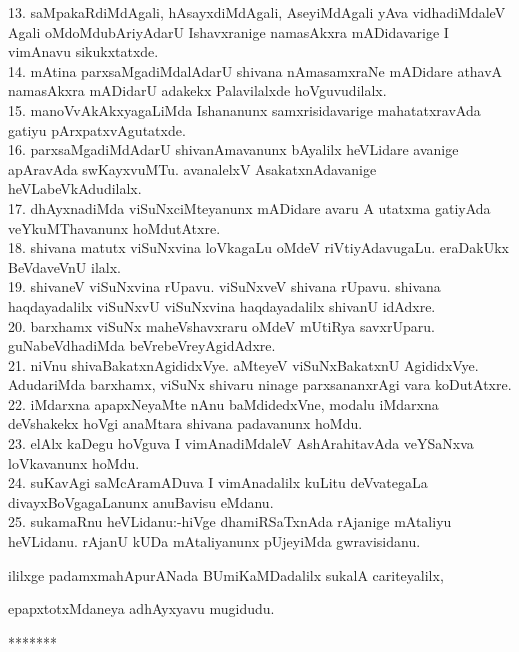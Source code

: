\documentclass{article}
\begin{document}
13. saMpakaRdiMdAgali, hAsayxdiMdAgali, AseyiMdAgali yAva vidhadiMdaleV Agali oMdoMdubAriyAdarU Ishavxranige namasAkxra mADidavarige I vimAnavu sikukxtatxde.\\
14. mAtina parxsaMgadiMdalAdarU shivana nAmasamxraNe mADidare athavA namasAkxra mADidarU adakekx Palavilalxde hoVguvudilalx.\\
15. manoVvAkAkxyagaLiMda Ishananunx samxrisidavarige mahatatxravAda gatiyu pArxpatxvAgutatxde.\\
16. parxsaMgadiMdAdarU shivanAmavanunx bAyalilx heVLidare avanige apAravAda swKayxvuMTu. avanalelxV AsakatxnAdavanige heVLabeVkAdudilalx.\\
17. dhAyxnadiMda viSuNxciMteyanunx mADidare avaru A utatxma gatiyAda veYkuMThavanunx hoMdutAtxre.\\
18. shivana matutx viSuNxvina loVkagaLu oMdeV riVtiyAdavugaLu. eraDakUkx BeVdaveVnU ilalx.\\
19. shivaneV viSuNxvina rUpavu. viSuNxveV shivana rUpavu. shivana haqdayadalilx viSuNxvU viSuNxvina haqdayadalilx shivanU idAdxre.\\
20. barxhamx viSuNx maheVshavxraru oMdeV mUtiRya savxrUparu. guNabeVdhadiMda beVrebeVreyAgidAdxre.\\
21. niVnu shivaBakatxnAgididxVye. aMteyeV viSuNxBakatxnU AgididxVye. AdudariMda barxhamx, viSuNx shivaru ninage parxsananxrAgi vara koDutAtxre.\\
22. iMdarxna apapxNeyaMte nAnu baMdidedxVne, modalu iMdarxna deVshakekx hoVgi anaMtara shivana padavanunx hoMdu.\\
23. elAlx kaDegu hoVguva I vimAnadiMdaleV AshArahitavAda veYSaNxva loVkavanunx hoMdu.\\
24. suKavAgi saMcAramADuva I vimAnadalilx kuLitu deVvategaLa divayxBoVgagaLanunx anuBavisu eMdanu.\\
25. sukamaRnu heVLidanu:-hiVge dhamiRSaTxnAda rAjanige mAtaliyu heVLidanu. rAjanU kUDa mAtaliyanunx pUjeyiMda gwravisidanu.\\

\begin{center}
ililxge padamxmahApurANada BUmiKaMDadalilx sukalA cariteyalilx,
\end{center}

\begin{center}
epapxtotxMdaneya adhAyxyavu mugidudu.
\end{center}

\begin{center}
*******
\end{center}
\end{document}
